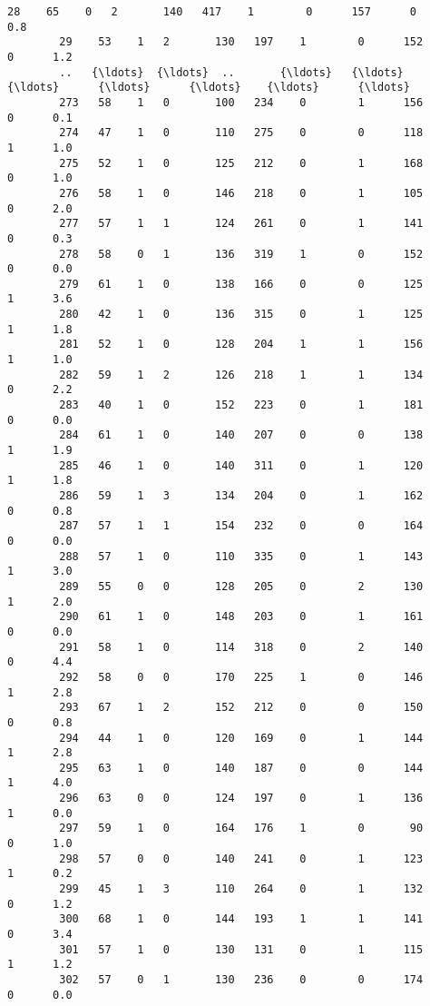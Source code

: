 \documentclass[11pt]{article}
\begin{document}
\begin{Verbatim}[commandchars=\\\{\}]
        28    65    0   2       140   417    1        0      157      0      0.8   
        29    53    1   2       130   197    1        0      152      0      1.2   
        ..   {\ldots}  {\ldots}  ..       {\ldots}   {\ldots}  {\ldots}      {\ldots}      {\ldots}    {\ldots}      {\ldots}   
        273   58    1   0       100   234    0        1      156      0      0.1   
        274   47    1   0       110   275    0        0      118      1      1.0   
        275   52    1   0       125   212    0        1      168      0      1.0   
        276   58    1   0       146   218    0        1      105      0      2.0   
        277   57    1   1       124   261    0        1      141      0      0.3   
        278   58    0   1       136   319    1        0      152      0      0.0   
        279   61    1   0       138   166    0        0      125      1      3.6   
        280   42    1   0       136   315    0        1      125      1      1.8   
        281   52    1   0       128   204    1        1      156      1      1.0   
        282   59    1   2       126   218    1        1      134      0      2.2   
        283   40    1   0       152   223    0        1      181      0      0.0   
        284   61    1   0       140   207    0        0      138      1      1.9   
        285   46    1   0       140   311    0        1      120      1      1.8   
        286   59    1   3       134   204    0        1      162      0      0.8   
        287   57    1   1       154   232    0        0      164      0      0.0   
        288   57    1   0       110   335    0        1      143      1      3.0   
        289   55    0   0       128   205    0        2      130      1      2.0   
        290   61    1   0       148   203    0        1      161      0      0.0   
        291   58    1   0       114   318    0        2      140      0      4.4   
        292   58    0   0       170   225    1        0      146      1      2.8   
        293   67    1   2       152   212    0        0      150      0      0.8   
        294   44    1   0       120   169    0        1      144      1      2.8   
        295   63    1   0       140   187    0        0      144      1      4.0   
        296   63    0   0       124   197    0        1      136      1      0.0   
        297   59    1   0       164   176    1        0       90      0      1.0   
        298   57    0   0       140   241    0        1      123      1      0.2   
        299   45    1   3       110   264    0        1      132      0      1.2   
        300   68    1   0       144   193    1        1      141      0      3.4   
        301   57    1   0       130   131    0        1      115      1      1.2   
        302   57    0   1       130   236    0        0      174      0      0.0   
        

\end{Verbatim}
\end{document}
